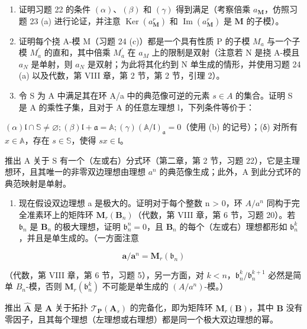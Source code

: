 \begin{enumerate}
\def\labelenumi{(\alph{enumi})}
\item
   证明习题 22 的条件 \((\alpha)\)、\((\beta)\) 和 \((\gamma)\) 得到满足（考察倍乘 \(a_{\mathbf{M}}\)，仿照习题 23 (a) 进行论证，并注意 \(\operatorname{Ker}(a_{\mathbf{M}}^{r})\) 和 \(\operatorname{Im}(a_{\mathbf{M}}^{r})\) 是 \(\mathbf{M}\) 的子模）。
\item
  证明每个挠 A-模 M（习题 24 (c)）都是一个具有性质 P 的子模 \(M_{a}\) 与一个子模 \(M_{a}^{\prime}\) 的直和，其中倍乘 \(M_{a}^{\prime}\) 在 \(a_{M}\) 上的限制是双射（注意若 N 是挠 A-模且 \(a_{N}\) 是单射，则 \(a_{N}\) 是双射；为此将其化约到 N 单生成的情形，并使用习题 24 (a) 以及代数，第 VIII 章，第 2 节，第 2 节，引理 2）。
\item
   令 S 为 A 中满足其在环 A/a 中的典范像可逆的元素 \(s \in A\) 的集合。证明 S 是 A 的乘性子集，且对于 A 的任意左理想 l，下列条件等价于：
\end{enumerate}

\((\alpha) \mathfrak{l} \cap \mathbb{S} \neq \varnothing; (\beta) \mathfrak{l} + \mathfrak{a} = \mathbb{A}; (\gamma) (\mathbb{A} / \mathfrak{l})_{\mathfrak{a}} = 0\)（使用 (b) 的记号）；(δ) 对所有 \(x \in \mathbb{A}\)，存在 \(s \in \mathbb{S}\)，使得 \(sx \in \mathfrak{l}\)。

推出 A 关于 S 有一个（左或右）分式环（第二章，第 2 节，习题 22），它是主理想环，且其唯一的非零双边理想由理想 \(a^{n}\) 的典范像生成；此外，A 到此分式环的典范映射是单射。

\begin{enumerate}
\def\labelenumi{(\alph{enumi})}
\setcounter{enumi}{3}
\tightlist
\item
  现在假设双边理想 a 是极大的。证明对于每个整数 n \textgreater{} 0，环 \(A/a^{n}\) 同构于完全准素环上的矩阵环 \(\mathbf{M}_{r}(\mathbf{B}_{n})\)（代数，第 VIII 章，第 6 节，习题 20）。若 \(\mathfrak{b}_n\) 是 \(\mathbf{B}_n\) 的极大理想，证明 \(\mathfrak{b}_n^n = 0\)，且 \(\mathbf{B}_n\) 的每个（左或右）理想都形如 \(\mathfrak{b}_n^k\)，并且是单生成的。（一方面注意
\end{enumerate}

\[
\mathbf {a} / \mathbf {a} ^ {n} = \mathbf {M} _ {r} (\mathfrak {b} _ {n})
\]

（代数，第 VIII 章，第 6 节，习题 5），另一方面，对 \(k < n\)，\(\mathfrak{b}_n^k / \mathfrak{b}_n^{k+1}\) 必然是简单 \(B_n\)-模，否则 \(\mathbf{M}_r(\mathfrak{b}_n^k)\) 不可能是单生成的 \((A / a^n)\)-模。）

 推出 \(\hat{\mathbf{A}}\) 是 \(\mathbf{A}\) 关于拓扑 \(\mathcal{T}_{\mathbf{P}}(\mathbf{A}_s)\) 的完备化，即为矩阵环 \(\mathbf{M}_r(\mathbf{B})\)，其中 \(\mathbf{B}\) 没有零因子，且其每个理想（左理想或右理想）都是同一个极大双边理想的幂。


